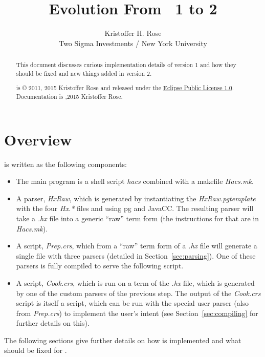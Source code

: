 \documentclass[11pt]{article} %
\title{
  Evolution From \HAX\ 1 to 2
}
\author{
  Kristoffer H. Rose\\
  Two Sigma Investments / New York University
}
\newcommand{\basecopyright}{\noindent
  \HAX is © 2011, 2015 Kristoffer Rose and released under the
  \href{https://www.eclipse.org/legal/epl-v10.html}{Eclipse Public License 1.0}.\\
  \noindent Documentation is \doclicenseImage[imagewidth=3em]
  2011,2015 Kristoffer Rose.}
\newcommand{\documentcopyright}{\basecopyright}
\begin{document}
\maketitle

\begin{abstract}\noindent
  This document discusses curious implementation details of \HAX version 1 and how they should be
  fixed and new things added in \HAX version 2.

  \compacttableofcontents

  \vspace*{2em}\small\color{gray}\noindent%
  \documentcopyright
\end{abstract}


\section{Overview}\label{sec:overview}

 is written as the following components:
\begin{itemize}

\item The main program is a shell script \emph{hacs} combined with a makefile \emph{Hacs.mk}.

\item A parser, \emph{HxRaw}, which is generated by instantiating the \emph{HxRaw.pgtemplate} with
  the four \emph{Hx.*} files and using pg and JavaCC. The resulting parser will take a \emph{.hx}
  file into a generic ``raw''  term form (the instructions for that are in \emph{Hacs.mk}).

\item A  script, \emph{Prep.crs}, which from a ``raw''  term form of a \emph{.hx} file
  will generate a single file with three parsers (detailed in Section~\ref{sec:parsing}). One of
  these parsers is fully compiled to serve the following script.

\item A  script, \emph{Cook.crs}, which is run on a  term of the \emph{.hx} file, which
  is generated by one of the custom parsers of the previous step. The output of the \emph{Cook.crs}
  script is itself a  script, which can be run with the special user parser (also from
  \emph{Prep.crs}) to implement the user's intent (see Section~\ref{sec:compiling} for further
  details on this).

\end{itemize}
The following sections give further details on how  is implemented and what should be fixed for
.
\end{document}
